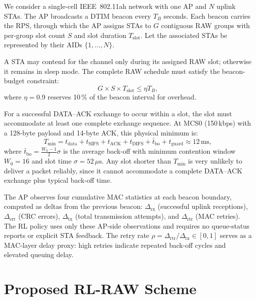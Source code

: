 \documentclass[conference]{IEEEtran}
\begin{document}
We consider a single-cell IEEE~802.11ah network with one AP and $N$ uplink
STAs.
The AP broadcasts a DTIM beacon every $T_B$ seconds.
Each beacon carries the RPS, through which the AP assigns STAs to $G$
contiguous RAW groups with per-group slot count $S$ and slot duration
$T_\text{slot}$.
Let the associated STAs be represented by their AIDs $\{1, \ldots, N\}$.

A STA may contend for the channel only during its assigned RAW slot;
otherwise it remains in sleep mode.
The complete RAW schedule must satisfy the beacon-budget constraint:
\begin{equation}
  G \times S \times T_\text{slot} \leq \eta T_B,
  \label{eq:budget}
\end{equation}
where $\eta = 0.9$ reserves 10\,\% of the beacon interval for overhead.

For a successful DATA–ACK exchange to occur within a slot, the slot must
accommodate at least one complete exchange sequence.
At MCS0 (150\,kbps) with a 128-byte payload and 14-byte ACK, this physical
minimum is:
\begin{equation}
  T_\text{min} = t_\text{data} + t_\text{SIFS} + t_\text{ACK} +
                 t_\text{DIFS} + \bar{t}_\text{bo} + t_\text{guard}
                 \approx 12\,\text{ms},
  \label{eq:tmin}
\end{equation}
where $\bar{t}_\text{bo} = \frac{W_0 - 1}{2} \sigma$ is the average
back-off with minimum contention window $W_0 = 16$ and slot time
$\sigma = 52\,\mu\text{s}$.
Any slot shorter than $T_\text{min}$ is very unlikely to deliver a packet
reliably, since it cannot accommodate a complete DATA–ACK exchange
plus typical back-off time.

The AP observes four cumulative MAC statistics at each beacon boundary,
computed as deltas from the previous beacon:
$\Delta_\text{rx}$ (successful uplink receptions),
$\Delta_\text{err}$ (CRC errors),
$\Delta_\text{tx}$ (total transmission attempts), and
$\Delta_\text{rtr}$ (MAC retries).
The RL policy uses only these AP-side observations and requires no
queue-status reports or explicit STA feedback.
The retry rate $\rho = \Delta_\text{rtr}/\Delta_\text{tx} \in [0,1]$
serves as a MAC-layer delay proxy: high retries indicate repeated back-off
cycles and elevated queuing delay.

\section{Proposed RL-RAW Scheme}
\end{document}
